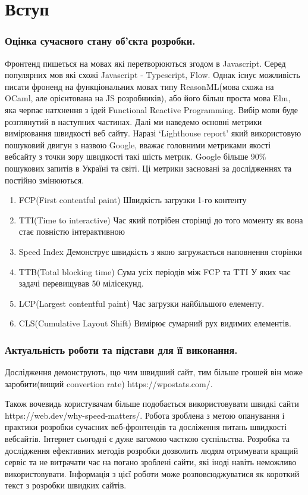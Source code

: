 \newpage
\section*{Вступ}
\label{sec:intro}
\subsubsection*{Оцінка сучасного стану об’єкта розробки.}
Фронтенд пишеться на мовах які перетворюються згодом в Javascript.
Серед популярних мов які схожі Javascript - Typescript, Flow.
Однак існує можливість писати фроненд на функціональних мовах типу
ReasonML(мова схожа на OCaml, але орієнтована на JS розробників),
або його більш проста мова Elm, яка черпає натхнення з ідей Functional Reactive Programming.
Вибір мови буде розглянутий в наступних частинах.
Далі ми наведемо основні метрики вимірювання швидкості веб сайту.
Наразі `Lighthouse report' який використовую пошуковий двигун з назвою Google, вважає головними метриками якості вебсайту з точки зору швидкості такі шість метрик.
Google більше 90\% пошукових запитів в Україні та світі.
Ці метрики засновані за дослідженнях та постійно змінюються.
\begin{enumerate}
    \item FCP(First contentful paint) Швидкість загрузки 1-го контенту
    \item TTI(Time to interactive) Час який потрібен сторінці до того моменту як вона стає повністю інтерактивною
    \item Speed Index Демонструє швидкість з якою загружається наповнення сторінки
    \item TTB(Total blocking time) Сума усіх періодів між FCP та TTI У яких час задачі перевищував 50 мілісекунд.
    \item LCP(Largest contentful paint) Час загрузки найбільшого елементу.
    \item CLS(Cumulative Layout Shift) Вимірює сумарний рух видимих елементів.
\end{enumerate}

\subsubsection*{Актуальність роботи та підстави для її виконання.}
Дослідження демонструють, що чим швидший сайт, тим більше грошей він може заробити(вищий convertion rate) https://wpostats.com/.

Також вочевидь користувачам більше подобається використовувати швидкі сайти https://web.dev/why-speed-matters/.
Робота зроблена з метою опанування і практики розробки сучасних веб-фронтендів та досліження питань швидкості вебсайтів.
Інтернет сьогодні є дуже вагомою часткою суспільства.
Розробка та дослідження ефективних методів розробки дозволить людям отримувати кращий сервіс та не витрачати
час на погано зроблені сайти, які іноді навіть неможливо використовувати.
Інформація з цієї роботи може розповсюджуватися як короткий текст з розробки швидких сайтів.

